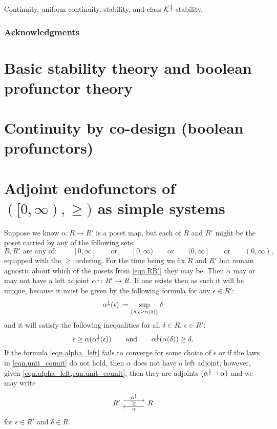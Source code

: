 \documentclass[11pt, one side, article]{memoir}
\newcommand{\adjpos}[6][30pt]{%
\begin{tikzcd}[ampersand replacement=\&, column sep=#1]
  #2\ar[r, shift left=4.5pt, "#3"]
  \ar[r, phantom, "\scriptstyle#6"]\&
  #5\ar[l, shift left=4.5pt, "#4"]
\end{tikzcd}
}
\theoremstyle{definition}
\theoremstyle{plain}
\newcommand{\cat}[1]{\mathcal{#1}}%
\newcommand{\ldag}{^{\rotatebox{180}{$\dagger$}}}
\newcommand{\qqand}{\qquad\text{and}\qquad}
\newcommand{\qqor}{\qquad\text{or}\qquad}
\newcommand{\ivlnon}{[0,\infty)}
\newcommand{\K}{\cat{K}}
\newcommand{\Kdag}[1][0]{\K\ldag}
\begin{document}
Continuity, 
uniform continuity, 
stability, and
class $\Kdag$-stability.

\subsection*{Acknowledgments}



\chapter{Basic stability theory and boolean profunctor theory}
\label{chap.stability_and_profunctors}

\chapter{Continuity by co-design (boolean profunctors)}
\label{}

\chapter{Adjoint endofunctors of $(\ivlnon,\geq)$ as simple systems}
\label{}

Suppose we know $\alpha\colon R\to R'$ is a poset map, but each of $R$ and $R'$ might be the poset carried by any of the following sets:
\begin{equation}\label{eqn.RR'}
	R,R'\text{~are any of:~}\qquad
	[0,\infty]\qqor
	[0,\infty)\qqor
	(0,\infty]\qqor
	(0,\infty),
\end{equation}
equipped with the $\geq$ ordering. For the time being we fix $R$ and $R'$ but remain agnostic about which of the posets from \eqref{eqn.RR'} they may be. Then $\alpha$ may or may not have a left adjoint $\alpha\ldag\colon R'\to R$. If one exists then as such it will be unique, because it must be given by the following formula for any $\epsilon\in R'$:
\begin{equation}\label{eqn.alpha_left}
  \alpha\ldag(\epsilon):=\sup_{\{\delta\mid \epsilon\geq\alpha(\delta)\}}\delta
\end{equation}
and it will satisfy the following inequalities for all $\delta\in R$, $\epsilon\in R'$:
\begin{equation}\label{eqn.unit_counit}
  \epsilon\geq\alpha(\alpha\ldag(\epsilon))
  \qqand
  \alpha\ldag(\alpha(\delta))\geq\delta.
\end{equation}
If the formula \eqref{eqn.alpha_left} fails to converge for some choice of $\epsilon$ or if the laws in \eqref{eqn.unit_counit} do not hold, then $\alpha$ does not have a left adjoint; however, given \cref{eqn.alpha_left,eqn.unit_counit}, then they are adjoints $(\alpha\ldag\dashv\alpha)$ and we may write
\[
\adjpos{R'}{\alpha\ldag}{\alpha}{R}{\geq}
\]
for $\epsilon\in R'$ and $\delta\in R$.
\end{document}
